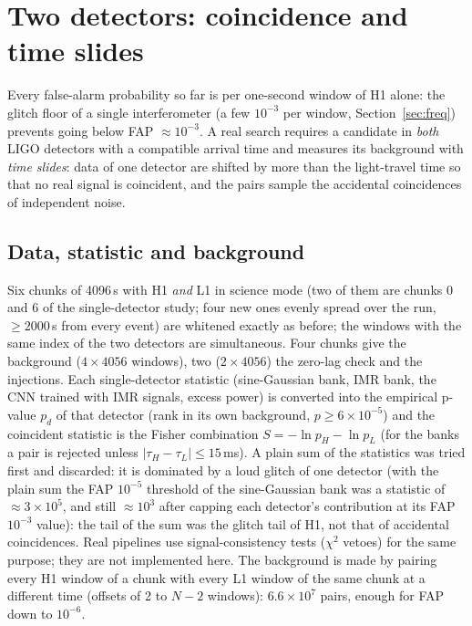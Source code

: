 \section{Two detectors: coincidence and time slides}\label{sec:coinc}

Every false-alarm probability so far is per one-second window of H1 alone: the glitch floor of a single interferometer (a few $10^{-3}$ per window, Section~\ref{sec:freq}) prevents going below FAP $\approx10^{-3}$. A real search requires a candidate in \emph{both} LIGO detectors with a compatible arrival time and measures its background with \emph{time slides}: data of one detector are shifted by more than the light-travel time so that no real signal is coincident, and the pairs sample the accidental coincidences of independent noise.

\subsection{Data, statistic and background}
Six chunks of 4096\,s with H1 \emph{and} L1 in science mode (two of them are chunks 0 and 6 of the single-detector study; four new ones evenly spread over the run, $\ge2000$\,s from every event) are whitened exactly as before; the windows with the same index of the two detectors are simultaneous. Four chunks give the background ($4\times4056$ windows), two ($2\times4056$) the zero-lag check and the injections.
Each single-detector statistic (sine-Gaussian bank, IMR bank, the CNN trained with IMR signals, excess power) is converted into the empirical p-value $p_d$ of that detector (rank in its own background, $p\ge6\times10^{-5}$) and the coincident statistic is the Fisher combination $S=-\ln p_H-\ln p_L$ (for the banks a pair is rejected unless $|\tau_H-\tau_L|\le15$\,ms). A plain sum of the statistics was tried first and discarded: it is dominated by a loud glitch of one detector (with the plain sum the FAP $10^{-5}$ threshold of the sine-Gaussian bank was a statistic of $\approx3\times10^5$, and still $\approx10^3$ after capping each detector's contribution at its FAP $10^{-3}$ value): the tail of the sum was the glitch tail of H1, not that of accidental coincidences. Real pipelines use signal-consistency tests ($\chi^2$ vetoes) for the same purpose; they are not implemented here.
The background is made by pairing every H1 window of a chunk with every L1 window of the same chunk at a different time (offsets of 2 to $N-2$ windows): $6.6\times10^7$ pairs, enough for FAP down to $10^{-6}$.

